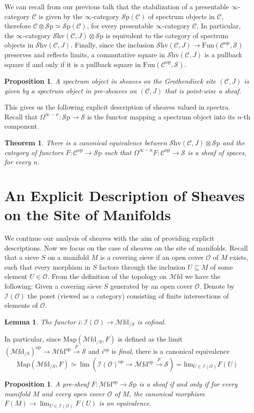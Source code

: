 \documentclass[10pt]{amsart}
\newcommand{\C}{\mathscr{C}}
\newcommand{\I}{\mathscr{I}}
\newcommand{\s}{\mathscr{S}}
\newcommand{\Map}{\mathrm{Map}}
\newcommand{\Sp}{\mathscr{S}\mathrm{p}}
\newcommand{\Fun}{\mathrm{Fun}}
\newcommand{\Mfd}{\mathscr{M}\mathrm{fd}}
\newcommand{\Shv}{\mathscr{S}\mathrm{hv}}
\newcommand{\op}{\mathrm{op}}
\newtheorem{theorem}[equation]{Theorem}
\newtheorem{lemma}[equation]{Lemma}
\newtheorem{proposition}[equation]{Proposition}
\theoremstyle{definition}
\theoremstyle{remark}
\numberwithin{equation}{section}
\begin{document}
We can recall from our previous talk that the stabilization of a presentable $\infty$-category $\C$ is given by the $\infty$-category $\Sp(\C)$ of spectrum objects in $\C$, therefore $\C\otimes\Sp  \simeq \Sp(\C)$, for every presentable $\infty$-category $\C$. In particular, the $\infty$-category $ \Shv(\C,J)\otimes \Sp$ is equivalent to the category of spectrum objects in $\Shv(\C,J)$. Finally, since the inclusion $\Shv(\C,J) \to \Fun(\C^{\op},\s)$ preserves and reflects limits, a commutative square in $\Shv(\C,J)$ is a pullback square if and only if it is a pullback square in $\Fun(\C^{\op},\s)$.

\begin{proposition}
  A spectrum object in sheaves on the Grothendieck site $(\C,J)$ is given by a spectrum object in pre-sheaves on $(\C,J)$ that is point-wise a sheaf.
\end{proposition}

This gives us the following explicit description of sheaves valued in spectra. Recall that $\Omega^{\infty-n}\colon\Sp\to\s$ is the functor mapping a spectrum object into its $n$-th component.
\begin{theorem}
  There is a canonical equivalence between $\Shv(\C,J)\otimes\Sp$ and the category of functors $F\colon \C^{\op} \to \Sp$ such that $\Omega^{\infty - n} F\colon \C^{\op} \to \s$ is a sheaf of spaces, for every $n$.
\end{theorem}

\section{An Explicit Description of Sheaves on the Site of Manifolds}
We continue our analysis of sheaves with the aim of providing explicit descriptions. Now we focus on the case of sheaves on the site of manifolds. Recall that a sieve $S$ on a manifold $M$ is a covering sieve if an open cover $\mathscr O$ of $M$ exists, such that every morphism in $S$ factors through the inclusion $U\subseteq M$ of some element $U\in\mathscr O$. From the definition of the topology on $\Mfd$ we have the following: Given a covering sieve $S$ generated by an open cover $\mathscr O$. Denote by $\I(\mathscr O)$ the poset (viewed as a category) consisting of finite intersections of elements of $\mathscr O$.
\begin{lemma}
	The functor $i:\I(\mathscr O)\rightarrow\Mfd_{/S}$ is cofinal.
\end{lemma}
In particular, since $\Map(\Mfd_{/S},F)$ is defined as the limit $(\Mfd_{/S})^{\op}\to\Mfd^{\op}\xrightarrow F\s$ and $i^{\op}$ is \emph{final}, there is a canonical equivalence \[\Map(\Mfd_{/S},F)\simeq\lim(\I(\mathscr O)^{\op}\to\Mfd^{\op}\xrightarrow F\s)=\textrm{lim}_{U\in\I(\mathscr O)}F(U)\]
\begin{proposition}\label{pro:sheaf}
  A pre-sheaf $F\colon \Mfd^{\op} \to \Sp$ is a sheaf if and only if for every manifold $M$ and every open cover $\mathscr O$ of $M$, the canonical morphism $F(M) \to \lim_{U \in \I(\mathscr O)}F(U)$ is an equivalence.
\end{proposition}
\end{document}

